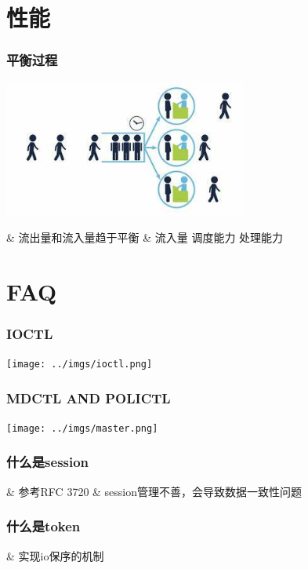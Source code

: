 \documentclass[UTF8,8pt,xcolor=dvipsnames]{beamer}
\newenvironment{myeasylist}[1]{
    \Activate
    \begin{tcolorbox}
    \begin{easylist}[#1]
} {
    \end{easylist}
    \end{tcolorbox}
    \Deactivate
}
\begin{document}
\section{性能}

\begin{frame}[fragile]
    \frametitle{平衡过程}
    \begin{center}
        \includegraphics[width=0.6\textwidth]{../imgs/queuing.jpeg}
    \end{center}

    \begin{myeasylist}{itemize}
        & 流出量和流入量趋于平衡
        & 流入量  调度能力  处理能力
    \end{myeasylist}
\end{frame}

\section{FAQ}

\begin{frame}[fragile]
    \frametitle{IOCTL}
    \begin{center}
        \texttt{[image: ../imgs/ioctl.png]}
    \end{center}

\end{frame}

\begin{frame}[fragile]
    \frametitle{MDCTL AND POLICTL}
    \begin{center}
       \texttt{[image: ../imgs/master.png]}
    \end{center}

\end{frame}


\begin{frame}[fragile]
    \frametitle{什么是session}

    \begin{myeasylist}{itemize}
        & 参考RFC 3720
        & session管理不善，会导致数据一致性问题
    \end{myeasylist}
\end{frame}


\begin{frame}[fragile]
    \frametitle{什么是token}

    \begin{myeasylist}{itemize}
        & 实现io保序的机制
    \end{myeasylist}
\end{frame}
\end{document}
